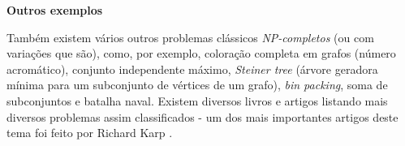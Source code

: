 \begin{trivlist}
\item \textbf{Outros exemplos}
\end{trivlist}

Também existem vários outros problemas clássicos \textit{NP-completos} (ou com variações que são), como, por exemplo, coloração completa em grafos (número acromático), conjunto independente máximo, \textit{Steiner tree} (árvore geradora mínima para um subconjunto de vértices de um grafo), \textit{bin packing}, soma de subconjuntos e batalha naval. Existem diversos livros e artigos listando mais diversos problemas assim classificados - um dos mais importantes artigos deste tema foi feito por Richard Karp \cite{karp1972}.